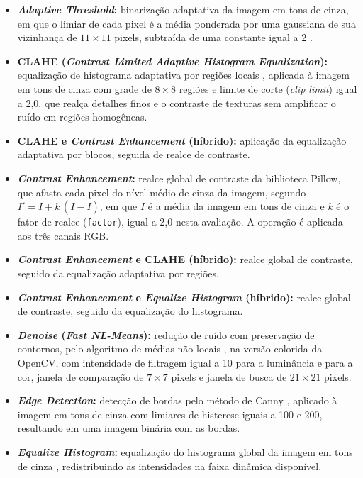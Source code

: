 \begin{itemize}
    \item \textbf{\textit{Adaptive Threshold}:} binarização adaptativa da imagem em tons de cinza, em que o limiar de cada pixel é a média ponderada por uma gaussiana de sua vizinhança de $11 \times 11$ pixels, subtraída de uma constante igual a 2 \cite{Gonzalez2008}.
    \item \textbf{CLAHE (\textit{Contrast Limited Adaptive Histogram Equalization}):} equalização de histograma adaptativa por regiões locais \cite{zuiderveld1994clahe}, aplicada à imagem em tons de cinza com grade de $8 \times 8$ regiões e limite de corte (\textit{clip limit}) igual a 2,0, que realça detalhes finos e o contraste de texturas sem amplificar o ruído em regiões homogêneas.
    \item \textbf{CLAHE e \textit{Contrast Enhancement} (híbrido):} aplicação da equalização adaptativa por blocos, seguida de realce de contraste.
    \item \textbf{\textit{Contrast Enhancement}:} realce global de contraste da biblioteca Pillow, que afasta cada pixel do nível médio de cinza da imagem, segundo $I' = \bar{I} + k\,(I - \bar{I})$, em que $\bar{I}$ é a média da imagem em tons de cinza e $k$ é o fator de realce (\texttt{factor}), igual a 2,0 nesta avaliação. A operação é aplicada aos três canais RGB.
    \item \textbf{\textit{Contrast Enhancement} e CLAHE (híbrido):} realce global de contraste, seguido da equalização adaptativa por regiões.
    \item \textbf{\textit{Contrast Enhancement} e \textit{Equalize Histogram} (híbrido):} realce global de contraste, seguido da equalização do histograma.
    \item \textbf{\textit{Denoise} (\textit{Fast NL-Means}):} redução de ruído com preservação de contornos, pelo algoritmo de médias não locais \cite{buades2005nonlocal}, na versão colorida da OpenCV, com intensidade de filtragem igual a 10 para a luminância e para a cor, janela de comparação de $7 \times 7$ pixels e janela de busca de $21 \times 21$ pixels.
    \item \textbf{\textit{Edge Detection}:} detecção de bordas pelo método de Canny \cite{canny1986computational}, aplicado à imagem em tons de cinza com limiares de histerese iguais a 100 e 200, resultando em uma imagem binária com as bordas.
    \item \textbf{\textit{Equalize Histogram}:} equalização do histograma global da imagem em tons de cinza \cite{Gonzalez2008}, redistribuindo as intensidades na faixa dinâmica disponível.

\end{itemize}
